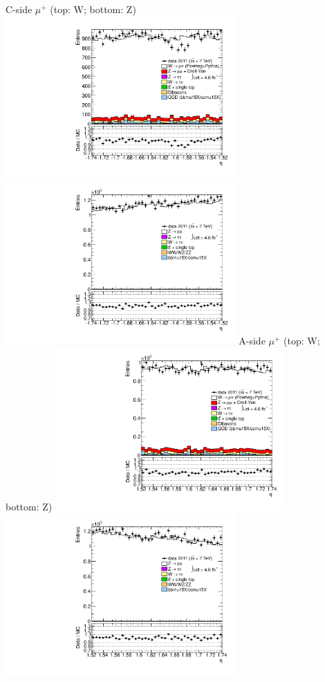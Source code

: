  {
\colb[T]
C-side $\mu^{+}$ (top: W; bottom: Z)
\centering
\includegraphics[width=0.66\textwidth]{dates/20130306/figures/both/WpItoI_8_C_stack_l_eta_POS} \\
\includegraphics[width=0.66\textwidth]{dates/20130306/figures/both/Z_8_C_stack_lP_eta_ALL.pdf}
A-side $\mu^{+}$ (top: W; bottom: Z)
\centering
\includegraphics[width=0.66\textwidth]{dates/20130306/figures/both/WpItoI_8_A_stack_l_eta_POS} \\
\includegraphics[width=0.66\textwidth]{dates/20130306/figures/both/Z_8_A_stack_lP_eta_ALL.pdf} 
\cole
}


